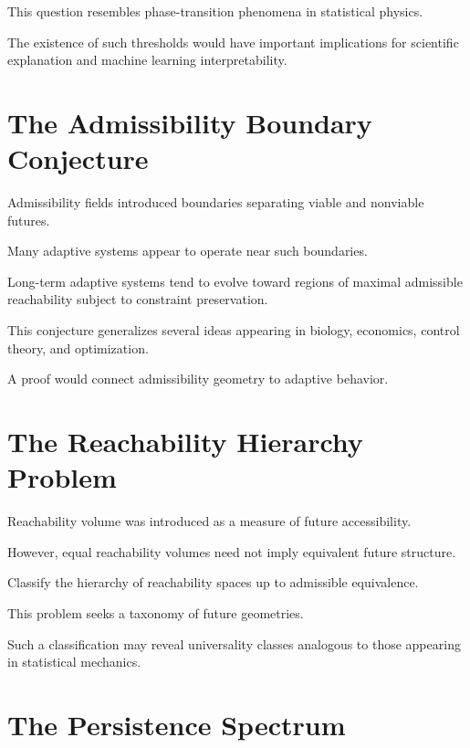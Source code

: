 \documentclass[11pt,oneside,openany]{book}
\begin{document}
This question resembles phase-transition phenomena in statistical physics.

The existence of such thresholds would have important implications for scientific explanation and machine learning interpretability.

\section{The Admissibility Boundary Conjecture}

Admissibility fields introduced boundaries separating viable and nonviable futures.

Many adaptive systems appear to operate near such boundaries.

\begin{conjecture}

Long-term adaptive systems tend to evolve toward regions of maximal admissible reachability subject to constraint preservation.

\end{conjecture}

This conjecture generalizes several ideas appearing in biology, economics, control theory, and optimization.

A proof would connect admissibility geometry to adaptive behavior.

\section{The Reachability Hierarchy Problem}

Reachability volume was introduced as a measure of future accessibility.

However, equal reachability volumes need not imply equivalent future structure.

\begin{problem}

Classify the hierarchy of reachability spaces up to admissible equivalence.

\end{problem}

This problem seeks a taxonomy of future geometries.

Such a classification may reveal universality classes analogous to those appearing in statistical mechanics.

\section{The Persistence Spectrum}
\end{document}
